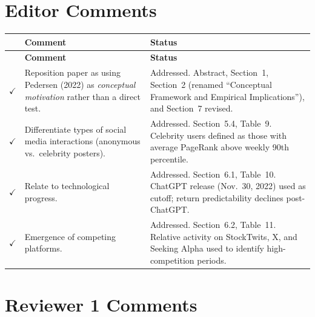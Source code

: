 \documentclass[11pt]{article}
\newcommand{\done}{\textcolor{done}{$\checkmark$}}
\begin{document}
\section{Editor Comments}

\begin{longtable}{p{} p{} p{}}
\toprule
& \textbf{Comment} & \textbf{Status} \\
\midrule
\endfirsthead
\toprule
& \textbf{Comment} & \textbf{Status} \\
\midrule
\endhead
\bottomrule
\endfoot

\done & Reposition paper as using Pedersen (2022) as \textit{conceptual motivation} rather than a direct test. &
  Addressed. Abstract, Section~1, Section~2 (renamed ``Conceptual Framework and Empirical Implications''), and Section~7 revised. \\[6pt]

\done & Differentiate types of social media interactions (anonymous vs.\ celebrity posters). &
  Addressed. Section~5.4, Table~9. Celebrity users defined as those with average PageRank above weekly 90th percentile. \\[6pt]

\done & Relate to technological progress. &
  Addressed. Section~6.1, Table~10. ChatGPT release (Nov.\ 30, 2022) used as cutoff; return predictability declines post-ChatGPT. \\[6pt]

\done & Emergence of competing platforms. &
  Addressed. Section~6.2, Table~11. Relative activity on StockTwits, X, and Seeking Alpha used to identify high-competition periods. \\

\end{longtable}

\section{Reviewer 1 Comments}
\end{document}
